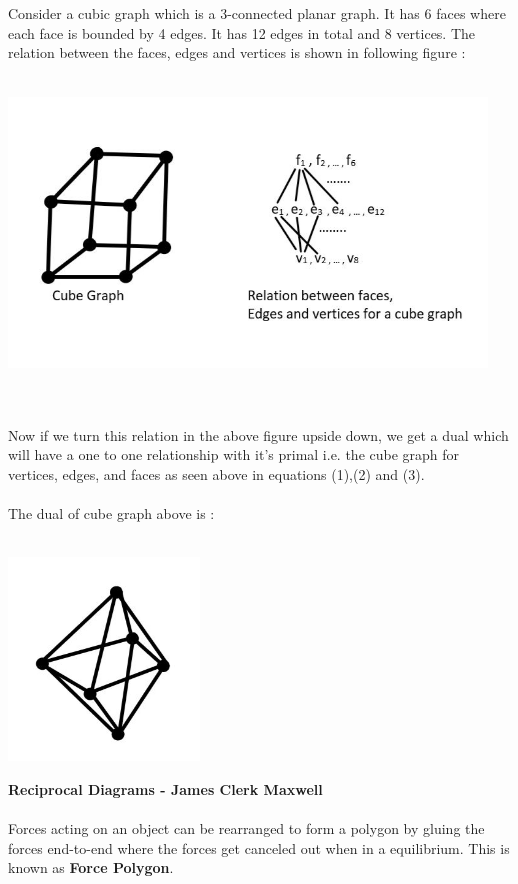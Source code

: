 \documentclass{article}
\begin{document}
    \\\\
    Consider a cubic graph which is a 3-connected planar graph. It has 6 faces where each face is bounded by 4 edges. It has 12 edges in total and 8 vertices. The relation between the faces, edges and vertices is shown in following figure : 
    \\\\
    \centerline{\includegraphics[width=5in]{Images/cube_graph.JPG}}
    \\\\
    Now if we turn this relation in the above figure upside down, we get a dual which will have a one to one relationship with it's primal i.e. the cube graph for vertices, edges, and faces as seen above in equations (1),(2) and (3).
    \\\\
    The dual of cube graph above is : 
    \\\\
    \centerline{\includegraphics[width=2in]{Images/octahedron.JPG}}
    \newpage
    \textbf{Reciprocal Diagrams - James Clerk Maxwell}
    \\\\
    Forces acting on an object can be rearranged to form a polygon by gluing the forces end-to-end where the forces get canceled out when in a equilibrium. This is known as \textbf{Force Polygon}.
\end{document}
